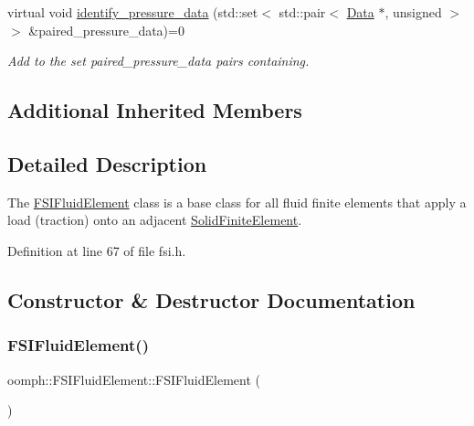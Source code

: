 \begin{DoxyCompactItemize}
virtual void \hyperlink{classoomph_1_1FSIFluidElement_af8e0805b769b7d111eb71f223fc83df8}{identify\+\_\+pressure\+\_\+data} (std\+::set$<$ std\+::pair$<$ \hyperlink{classoomph_1_1Data}{Data} $\ast$, unsigned $>$ $>$ \&paired\+\_\+pressure\+\_\+data)=0
\begin{DoxyCompactList}\small\item\em Add to the set {\ttfamily paired\+\_\+pressure\+\_\+data} pairs containing. \end{DoxyCompactList}\end{DoxyCompactItemize}
\subsection*{Additional Inherited Members}


\subsection{Detailed Description}
The \hyperlink{classoomph_1_1FSIFluidElement}{F\+S\+I\+Fluid\+Element} class is a base class for all fluid finite elements that apply a load (traction) onto an adjacent \hyperlink{classoomph_1_1SolidFiniteElement}{Solid\+Finite\+Element}. 

Definition at line 67 of file fsi.\+h.



\subsection{Constructor \& Destructor Documentation}
\mbox{\label{classoomph_1_1FSIFluidElement_a7de98463543c9e0661d4a9b248f71724}} 
\subsubsection{\texorpdfstring{F\+S\+I\+Fluid\+Element()}{FSIFluidElement()}\hspace{0.1cm}{\footnotesize\ttfamily [1/2]}}
{\footnotesize\ttfamily oomph\+::\+F\+S\+I\+Fluid\+Element\+::\+F\+S\+I\+Fluid\+Element (\begin{DoxyParamCaption}{ }\end{DoxyParamCaption})\hspace{0.3cm}{\ttfamily [inline]}}



